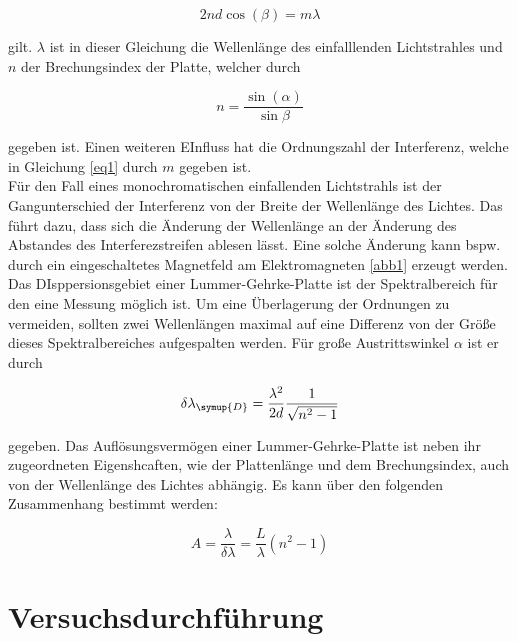 \begin{equation}
    2nd \cos(\beta) = m \lambda
    \label{eq1}
\end{equation}

gilt. $\lambda$ ist in dieser Gleichung die Wellenlänge des 
einfalllenden Lichtstrahles und $n$ der Brechungsindex der Platte, 
welcher durch 

\begin{equation}
    n = \frac{\sin(\alpha)}{\sin{\beta}}
    \label{eq2}
\end{equation}

gegeben ist. Einen weiteren EInfluss hat die Ordnungszahl der 
Interferenz, welche in Gleichung \ref{eq1} durch $m$
gegeben ist.\\
Für den Fall eines monochromatischen einfallenden 
Lichtstrahls ist der Gangunterschied der Interferenz von der
Breite der Wellenlänge des Lichtes. 
Das führt dazu, dass sich die Änderung der Wellenlänge an der 
Änderung des Abstandes des Interferezstreifen ablesen lässt.
Eine solche Änderung kann bspw. durch ein eingeschaltetes 
Magnetfeld am Elektromagneten \ref{abb1} erzeugt werden.\\
Das DIsppersionsgebiet einer Lummer-Gehrke-Platte ist 
der Spektralbereich für den eine Messung möglich ist. 
Um eine Überlagerung der Ordnungen zu vermeiden, sollten 
zwei Wellenlängen maximal auf eine Differenz von der 
Größe dieses Spektralbereiches aufgespalten werden. 
Für große Austrittswinkel $\alpha$ ist er durch 

\begin{equation}
    \delta \lambda_{\symup{D}} = \frac{\lambda^2}{2d} \frac{1}{\sqrt{n^2 -1}}
    \label{\eq{2}}
\end{equation}

gegeben. Das Auflösungsvermögen einer Lummer-Gehrke-Platte ist 
neben ihr zugeordneten Eigenshcaften, wie der Plattenlänge und 
dem Brechungsindex, auch von der Wellenlänge des Lichtes 
abhängig. Es kann über den folgenden Zusammenhang bestimmt 
werden:

\begin{equation}
    A = \frac{\lambda}{\delta \lambda} = \frac{L}{\lambda}(n^2 -1)
\end{equation}

\section{Versuchsdurchführung}
\label{sec:Versuchsdurchführung}

